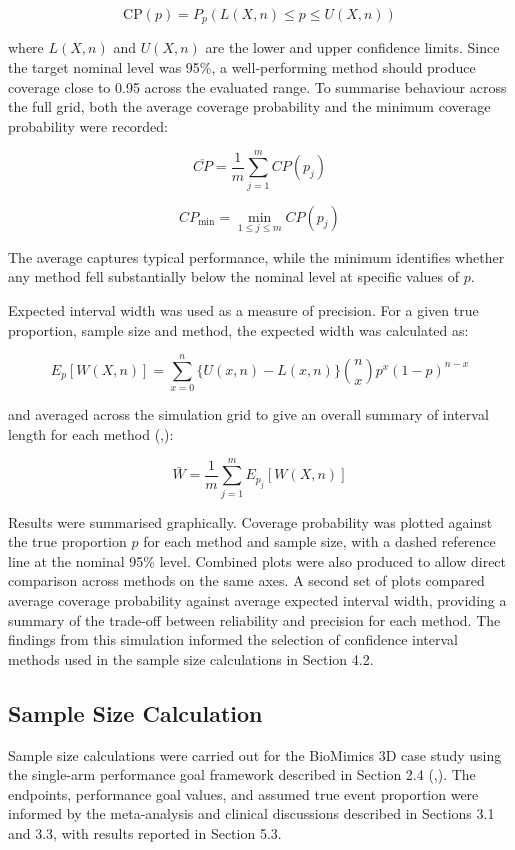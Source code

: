 \documentclass{article}
\begin{document}
\[\text{CP}(p) = P_p\!\left(L(X,n) \leq p \leq U(X,n)\right)\]

where \(L(X,n)\) and \(U(X,n)\) are the lower and upper confidence
limits. Since the target nominal level was 95\%, a well-performing
method should produce coverage close to 0.95 across the evaluated range.
To summarise behaviour across the full grid, both the average coverage
probability and the minimum coverage probability were recorded:

\[\overline{CP} = \frac{1}{m} \sum_{j=1}^{m} CP(p_j)\]

\[CP_{\min} = \min_{1 \leq j \leq m} CP(p_j)\]

The average captures typical performance, while the minimum identifies
whether any method fell substantially below the nominal level at
specific values of \(p\).

Expected interval width was used as a measure of precision. For a given
true proportion, sample size and method, the expected width was
calculated as:

\[E_p[W(X,n)] = \sum_{x=0}^{n} \{U(x,n) - L(x,n)\} \binom{n}{x} p^x (1-p)^{n-x}\]

and averaged across the simulation grid to give an overall summary of
interval length for each method
(,):

\[\bar{W} = \frac{1}{m} \sum_{j=1}^{m} E_{p_j}[W(X,n)]\]

Results were summarised graphically. Coverage probability was plotted
against the true proportion \(p\) for each method and sample size, with
a dashed reference line at the nominal 95\% level. Combined plots were
also produced to allow direct comparison across methods on the same
axes. A second set of plots compared average coverage probability
against average expected interval width, providing a summary of the
trade-off between reliability and precision for each method. The
findings from this simulation informed the selection of confidence
interval methods used in the sample size calculations in Section 4.2.

\subsection{Sample Size Calculation}\label{sample-size-calculation}

Sample size calculations were carried out for the BioMimics 3D case
study using the single-arm performance goal framework described in
Section 2.4
(,).
The endpoints, performance goal values, and assumed true event
proportion were informed by the meta-analysis and clinical discussions
described in Sections 3.1 and 3.3, with results reported in Section 5.3.
\end{document}

